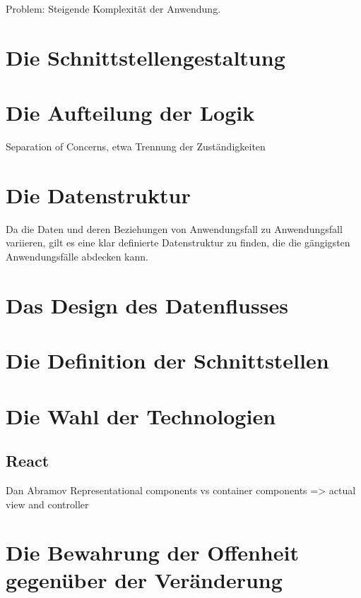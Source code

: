 Problem: Steigende Komplexität der Anwendung.

\section{Die Schnittstellengestaltung}

\section{Die Aufteilung der Logik}
\label{sec:die-aufteilung-der-logic}
Separation of Concerns, etwa Trennung der Zuständigkeiten

\section{Die Datenstruktur}
Da die Daten und deren Beziehungen von Anwendungsfall zu Anwendungsfall
variieren, gilt es eine klar definierte Datenstruktur zu finden, die
die gängigsten Anwendungsfälle abdecken kann. 


\section{Das Design des Datenflusses}
\label{sec:das-design-des-datenflusses}

\section{Die Definition der Schnittstellen}
\label{sec:die-definition-der-schnittstellen}

\section{Die Wahl der Technologien}

\subsection{React}
Dan Abramov Representational components vs container components => actual view and controller


\section{Die Bewahrung der Offenheit gegenüber der Veränderung}
\label{sec:die-bewahrung-der-offenheit-gegenueber-der-veraenderung}

